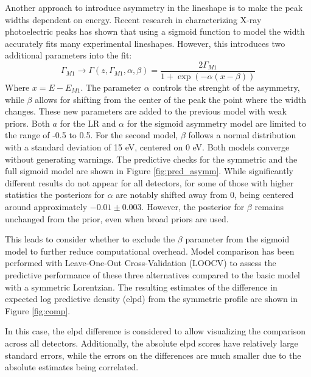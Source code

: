 Another approach to introduce asymmetry in the lineshape is to make the peak widths dependent on energy. Recent research \cite{schmid2014new} in characterizing X-ray photoelectric peaks has shown that using a sigmoid function to model the width accurately fits many experimental lineshapes. However, this introduces two additional parameters into the fit:
\begin{equation}
\Gamma_{M1} \rightarrow \Gamma(z, \Gamma_{M1}, \alpha, \beta) = \frac{2\Gamma_{M1}}{1+\exp(-\alpha(x-\beta))}
\end{equation}
Where $x = E - E_{M1}$. The parameter $\alpha$ controls the strenght of the asymmetry, while $\beta$ allows for
shifting from the center of the peak the point where the width changes. These new parameters
are added to the previous model with weak priors. Both $a$ for the LR and $\alpha$ for the sigmoid asymmetry model are limited to the
range of -0.5 to 0.5. For the second model, $\beta$ follows a normal distribution with a standard deviation of 15 eV, centered on 0 eV.
Both models converge without generating warnings. The predictive checks for the symmetric and the full sigmoid model are
shown in Figure \ref{fig:pred_asymm}. While significantly different results do not appear for all detectors, for some of
those with higher statistics the
posteriors for $\alpha$ are notably shifted away from 0, being centered around approximately $-0.01 \pm 0.003$. However,
the posterior for $\beta$ remains unchanged from the prior, even when broad priors are used.

This leads to consider whether to exclude the $\beta$ parameter from the sigmoid model to further reduce computational
overhead. Model comparison has been performed with Leave-One-Out Cross-Validation (LOOCV) to assess the predictive
performance of these three alternatives compared to the basic model with a symmetric Lorentzian. The resulting
estimates of the difference in expected log predictive density (elpd) from the symmetric profile are shown in Figure
\ref{fig:comp}.

In this case, the elpd difference is considered to allow visualizing the comparison across all detectors.
Additionally, the absolute elpd scores have relatively large standard errors, while the errors on the differences
are much smaller due to the absolute estimates being correlated.


